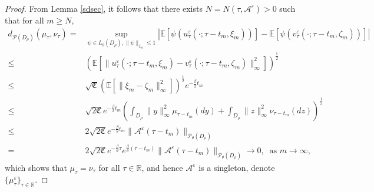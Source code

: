\documentclass[11pt]{article}
\numberwithin{equation}{section}
\theoremstyle{plain}
\begin{document}
\begin{proof}
 From Lemma \ref{sdsec}, 
 it follows that  
 there exists
 $N=N(\tau, \mathcal{A}^\varepsilon)>0$
 such that for all $m\ge N$,
 \begin{align} \label{sa-1}
      d_{\mathcal{P}(D_\rho)} \left( \mu_\tau, \nu_\tau \right)
    = & \sup_{ \psi \in L_b(D_\rho), \|\psi\|_{L_b} \le 1 }
                \left| \mathbb{E}
                               \left[ \psi( u^\varepsilon_\tau(\cdot; \tau-t_m, \xi_m) )
                               \right]
                         - \mathbb{E}
                                  \left[ \psi( v^\varepsilon_\tau(\cdot; \tau-t_m, \zeta_m) )
                                  \right]
               \right|  \nonumber\\
 \le & \left( \mathbb{E}
                         \left[ \| u^\varepsilon_\tau(\cdot; \tau-t_m, \xi_m )
                                      - v^\varepsilon_\tau(\cdot; \tau-t_m, \zeta_m )
                                  \|_{\infty}^2
                         \right]
              \right)^{\frac{1}{2} }  \nonumber\\
  \le & \sqrt{\mathfrak{C} } 
                 \left( \mathbb{E} \left[ \|  \xi_m- \zeta_m \|_{\infty}^2 \right] 
                 \right)^{\frac{1}{2} }  
                    e^{-\frac{\beta }{2} t_m}   \nonumber\\
  \le & \sqrt{2 \mathfrak{C} } 
               e^{-\frac{\beta }{2} t_m} 
                     \left( \int_{D_\rho} \|y\|_{\infty}^2 \mu_{\tau-t_m}(dy)
                               + \int_{D_\rho} \|z\|_{\infty}^2 \nu_{\tau-t_m}(dz)
                     \right)^{\frac{1}{2} }  \nonumber\\
  \le & 2 \sqrt{2 \mathfrak{C} }
                  e^{-\frac{\beta}{\theta} t_m} 
                         \| \mathcal{A}^\varepsilon(\tau-t_m) \|_{\mathcal{P}_{\theta}(D_\rho) }  \nonumber\\ 
    = & 2 \sqrt{2 \mathfrak{C} }
                   e^{-\frac{\beta }{\theta} \tau} e^{\frac{\beta}{\theta} (\tau-t_m)} 
                      \| \mathcal{A}^\varepsilon(\tau-t_m) \|_{\mathcal{P}_{\theta}(D_\rho) }
                      \to 0, \ \text{ as } m \to \infty, 
 \end{align} 
 which shows that
   $\mu_\tau = \nu_\tau$ for all $\tau\in\mathbb{R}$, and hence 
 $\mathcal{A}^\varepsilon$ is a singleton,  denote  
 $\{\mu_\tau^\varepsilon\}_{\tau\in\mathbb{R}}$. 


\end{proof}
\end{document}
